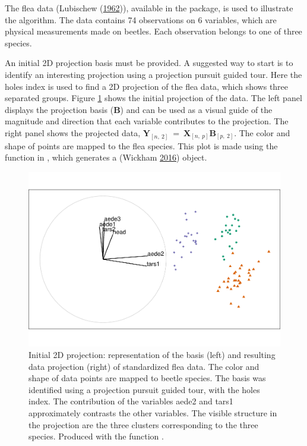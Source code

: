 The flea data (Lubischew
(\protect\hyperlink{ref-lubischew_use_1962}{1962})), available in the
 package, is used to illustrate the algorithm. The data
contains 74 observations on 6 variables, which are physical measurements
made on beetles. Each observation belongs to one of three species.

An initial 2D projection basis must be provided. A suggested way to
start is to identify an interesting projection using a projection
pursuit guided tour. Here the holes index is used to find a 2D
projection of the flea data, which shows three separated groups. Figure
\ref{fig:step0} shows the initial projection of the data. The left panel
displays the projection basis (\(\textbf{B}\)) and can be used as a
visual guide of the magnitude and direction that each variable
contributes to the projection. The right panel shows the projected data,
\(\textbf{Y}_{[n,~2]} ~=~ \textbf{X}_{[n,~p]} \textbf{B}_{[p,~2]}\). The
color and shape of points are mapped to the flea species. This plot is
made using the  function in , which
generates a  (Wickham
\protect\hyperlink{ref-wickham_ggplot2:_2016}{2016}) object.

\begin{Schunk}
\begin{figure}

{\centering \includegraphics[width=0.7\linewidth]{spinifex_paper_files/figure-latex/step0-1} 

}

\caption[Initial 2D projection]{Initial 2D projection: representation of the basis  (left) and resulting data projection (right) of standardized flea data. The color and shape of data points are mapped to beetle species. The basis was identified using a projection pursuit guided tour, with the holes index. The contribution of the variables aede2 and tars1 approximately contrasts the other variables. The visible structure in the projection are the three clusters corresponding to the three species. Produced with the function .}\label{fig:step0}
\end{figure}
\end{Schunk}

